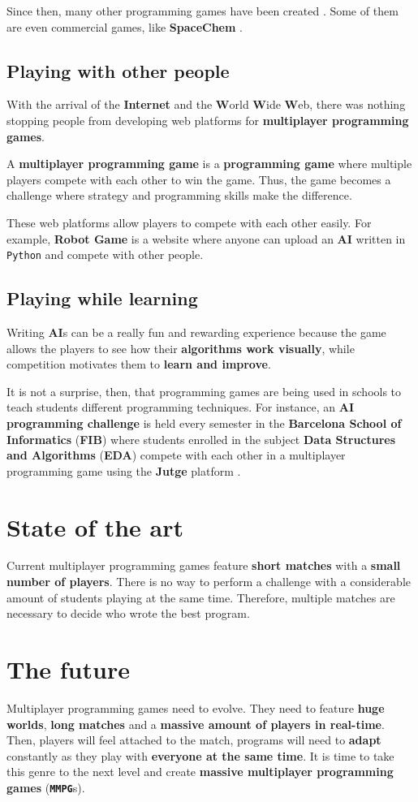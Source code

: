 \documentclass[a4paper,11pt,titlepage,abstract,numbers=noenddot,automark,mnsy,intlimits,rgb,dvipsnames]{report}
\begin{document}
Since then, many other programming games have been created \cite{pg}. Some of them are even commercial games, like
\textbf{SpaceChem} \cite{spacechem}.
\subsection{Playing with other people}
With the arrival of the \textbf{Internet} and the \textbf{W}orld \textbf{W}ide \textbf{W}eb, there was nothing stopping people from
developing web platforms for \textbf{multiplayer programming games}.

A \textbf{multiplayer programming game} is a \textbf{programming game} where multiple players compete with each other to win the
game. Thus, the game becomes a challenge where strategy and programming skills make the difference.

These web platforms allow players to compete with each other easily. For example, \textbf{Robot Game}
\cite{robotgame} is a website where anyone can upload an \textbf{AI} written in \texttt{Python} and compete with other people.
\subsection{Playing while learning}
Writing \textbf{AI}s can be a really fun and rewarding experience because the game allows the players to see how their
\textbf{algorithms work visually}, while competition motivates them to \textbf{learn and improve}.

It is not a surprise, then, that programming games are being used in schools to teach students different programming
techniques. For instance, an \textbf{AI programming challenge} is held every semester in the \textbf{Barcelona School of
Informatics} (\textbf{FIB}) where students enrolled in the subject \textbf{Data Structures and Algorithms} (\textbf{EDA}) \cite{eda}
compete with each other in a multiplayer programming game using the \textbf{Jutge} platform \cite{jutge}.
\section{State of the art}
Current multiplayer programming games feature \textbf{short matches} with a \textbf{small number of players}. There
is no way to perform a challenge with a considerable amount of students playing at the same time. Therefore, multiple
matches are necessary to decide who wrote the best program.
\section{The future}
Multiplayer programming games need to evolve. They need to feature \textbf{huge worlds}, \textbf{long matches} and
a \textbf{massive amount of players in real-time}. Then, players will feel attached to the match, programs will need to
\textbf{adapt} constantly as they play with \textbf{everyone at the same time}. It is time to take this genre to the next level and
create \textbf{massive multiplayer programming games} (\textbf{\texttt{MMPG}}s).
\clearpage
\end{document}
